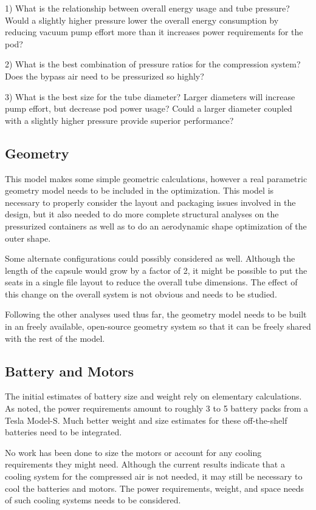 \documentclass[heading.tex]{subfiles}
\begin{document}
1) What is the relationship between overall energy usage and tube pressure? Would a slightly higher pressure lower the overall energy
consumption by reducing vacuum pump effort more than it increases power requirements for the pod?

2) What is the best combination of pressure ratios for the compression system? Does the bypass air need to be pressurized so highly?

3) What is the best size for the tube diameter? Larger diameters will increase pump effort, but decrease pod power usage? Could a larger
diameter coupled with a slightly higher pressure provide superior performance?

\subsection{Geometry}
This model makes some simple geometric calculations, however a real parametric geometry model needs to be included in the optimization.
This model is necessary to properly consider the layout and packaging issues involved in the design, but it also needed to do more 
complete structural analyses on the pressurized containers as well as to do an aerodynamic shape optimization of the outer shape.

Some alternate configurations could possibly considered as well. Although the length of the capsule would grow by a factor of 2, it
might be possible to put the seats in a single file layout to reduce the overall tube dimensions. The effect of this change on the overall
system is not obvious and needs to be studied.

Following the other analyses used thus far, the geometry model needs to be built in an freely available,
open-source geometry system so that it can be freely shared with the rest of the model.

\subsection{Battery and Motors}
The initial estimates of battery size and weight rely on elementary calculations. As noted, the power requirements amount to roughly
3 to 5 battery packs from a Tesla Model-S. Much better weight and size estimates for these off-the-shelf batteries need to be integrated.

No work has been done to size the motors or account for any cooling requirements they might need. Although the current results indicate
that a cooling system for the compressed air is not needed, it may still be necessary to cool the batteries and motors. The power
requirements, weight, and space needs of such cooling systems needs to be considered.
\end{document}
